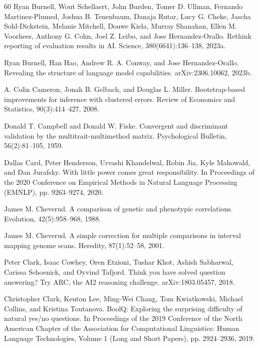 \begin{thebibliography}{60}
Ryan Burnell, Wout Schellaert, John Burden, Tomer D. Ullman, Fernando Martinez-Plumed, Joshua B. Tenenbaum, Danaja Rutar, Lucy G. Cheke, Jascha Sohl-Dickstein, Melanie Mitchell, Douwe Kiela, Murray Shanahan, Ellen M. Voorhees, Anthony G. Cohn, Joel Z. Leibo, and Jose Hernandez-Orallo. Rethink reporting of evaluation results in AI. Science, 380(6641):136--138, 2023a.

Ryan Burnell, Han Hao, Andrew R. A. Conway, and Jose Hernandez-Orallo. Revealing the structure of language model capabilities. arXiv:2306.10062, 2023b.

A. Colin Cameron, Jonah B. Gelbach, and Douglas L. Miller. Bootstrap-based improvements for inference with clustered errors. Review of Economics and Statistics, 90(3):414--427, 2008.

Donald T. Campbell and Donald W. Fiske. Convergent and discriminant validation by the multitrait-multimethod matrix. Psychological Bulletin, 56(2):81--105, 1959.

Dallas Card, Peter Henderson, Urvashi Khandelwal, Robin Jia, Kyle Mahowald, and Dan Jurafsky. With little power comes great responsibility. In Proceedings of the 2020 Conference on Empirical Methods in Natural Language Processing (EMNLP), pp. 9263--9274, 2020.

James M. Cheverud. A comparison of genetic and phenotypic correlations. Evolution, 42(5):958--968, 1988.

James M. Cheverud. A simple correction for multiple comparisons in interval mapping genome scans. Heredity, 87(1):52--58, 2001.

Peter Clark, Isaac Cowhey, Oren Etzioni, Tushar Khot, Ashish Sabharwal, Carissa Schoenick, and Oyvind Tafjord. Think you have solved question answering? Try ARC, the AI2 reasoning challenge. arXiv:1803.05457, 2018.

Christopher Clark, Kenton Lee, Ming-Wei Chang, Tom Kwiatkowski, Michael Collins, and Kristina Toutanova. BoolQ: Exploring the surprising difficulty of natural yes/no questions. In Proceedings of the 2019 Conference of the North American Chapter of the Association for Computational Linguistics: Human Language Technologies, Volume 1 (Long and Short Papers), pp. 2924--2936, 2019.


\end{thebibliography}
